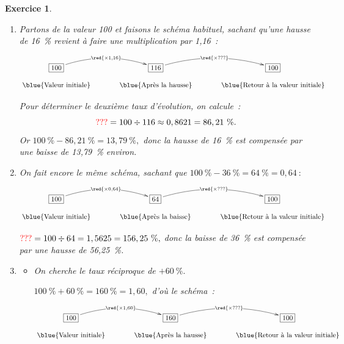 \documentclass[10pt]{article}
\newtheorem{exo}{Exercice}
\begin{document}
\begin{exo}

\begin{enumerate}
\item Partons de la valeur 100 et faisons le schéma habituel, sachant qu'une hausse de 16~\% revient à faire une multiplication par 1,16~:
   
   \begin{center}
    $\xymatrix@R=0.5pc@C=3pc{
    *+[F]+{100} \ar@/^0.5cm/[r]|{\red{\times 1,16}} & 
    *+[F]+{116} \ar@/^0.5cm/[r]|{\red{\times ???}} & *+[F]+{100} \\
    \txt{\blue{Valeur initiale}}&
    \txt{\blue{Après la hausse}}&\txt{\blue{Retour à la valeur initiale}}
    }$
    \end{center}
    Pour déterminer le deuxième taux d'évolution, on calcule~: \[\textcolor{red}{???}=100\div 116\approx 0,8621=86,21~\%.\] Or $100~\%-86,21~\%=13,79~\%,$ donc la hausse de 16~\% est compensée par une baisse de 13,79~\% environ.


\item On fait encore le même schéma, sachant que $100~\%-36~\%=64~\%=0,64~:$

\begin{center}
    $\xymatrix@R=0.5pc@C=3pc{
    *+[F]+{100} \ar@/^0.5cm/[r]|{\red{\times 0,64}} & 
    *+[F]+{64} \ar@/^0.5cm/[r]|{\red{\times ???}} & *+[F]+{100} \\
    \txt{\blue{Valeur initiale}}&
    \txt{\blue{Après la baisse}}&\txt{\blue{Retour à la valeur initiale}}
    }$
    \end{center}
$\textcolor{red}{???}=100\div 64 =1,5625=156,25~\%,$ donc la baisse de 36~\% est compensée par une hausse de 56,25~\%.
\item 
\begin{itemize}
\item[\textbullet] On cherche le taux réciproque de $+60~\%.$


$100~\%+60~\%=160~\%=1,60,$ d'où le schéma~:

\medskip
\begin{center}
    $\xymatrix@R=0.5pc@C=3pc{
    *+[F]+{100} \ar@/^0.5cm/[r]|{\red{\times 1,60}} & 
    *+[F]+{160} \ar@/^0.5cm/[r]|{\red{\times ???}} & *+[F]+{100} \\
    \txt{\blue{Valeur initiale}}&
    \txt{\blue{Après la hausse}}&\txt{\blue{Retour à la valeur initiale}}
    }$
    \end{center}
    
    \medskip


\end{itemize}
\end{enumerate}
\end{exo}
\end{document}
